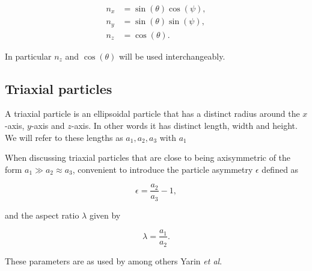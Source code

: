 \begin{subequations}\label{eq:nzEq}
\begin{align}
n_x 	&= \sin(\theta)\cos(\psi), \\
n_y 	&= \sin(\theta)\sin(\psi),\\
n_z		&= \cos(\theta).
\end{align}
\end{subequations}

\noindent In particular $n_z$ and $\cos(\theta)$ will be used interchangeably.

\subsection{Triaxial particles}
A triaxial particle is an ellipsoidal particle that has a distinct radius around the $x$-axis, $y$-axis and $z$-axis. In other words it has distinct length, width and height. We will refer to these lengths as $a_1, a_2, a_3$ with $a_1$


When discussing triaxial particles that are close to being axisymmetric of the form $a_1 \gg a_2 \approx a_3$, convenient to introduce the particle asymmetry $\epsilon$ defined as

\begin{equation}\label{eq:epsilon}
\epsilon = \frac{a_2}{a_3} - 1,
\end{equation}

and the aspect ratio $\lambda$ given by

\begin{equation}\label{eq:lambda}
\lambda = \frac{a_1}{a_2}.
\end{equation}

These parameters are as used by among others Yarin \emph{et al}\cite{Yarin}.



